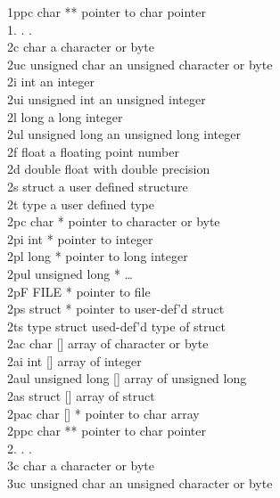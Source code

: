 \documentclass[12pt]{article}
\begin{document}
\begin{mylist}
1ppc      char **                 pointer to char pointer\\
1.          .                     . \\
2c        char                    a character or byte\\
2uc       unsigned char           an unsigned character or byte\\
2i        int                     an integer\\
2ui       unsigned int            an unsigned integer\\
2l        long                    a long integer\\
2ul       unsigned long           an unsigned long integer\\
2f        float                   a floating point number\\
2d        double          float with double precision\\
2s        struct          a user defined structure\\
2t        type                    a user defined type\\
2pc       char *          pointer to character or byte\\
2pi       int *                   pointer to integer\\
2pl       long *          pointer to long integer\\
2pul      unsigned long *         \dots\\
2pF       FILE *          pointer to file\\
2ps       struct *                pointer to user-def'd struct\\
2ts       type struct             used-def'd type of struct\\
2ac       char []                 array of character or byte\\
2ai       int []          array of integer\\
2aul      unsigned long []        array of unsigned long\\
2as       struct []               array of struct\\
2pac      char [] *               pointer to char array\\
2ppc      char **                 pointer to char pointer\\
2.          .                     . \\
3c        char                    a character or byte\\
3uc       unsigned char           an unsigned character or byte\\

\end{mylist}
\end{document}
